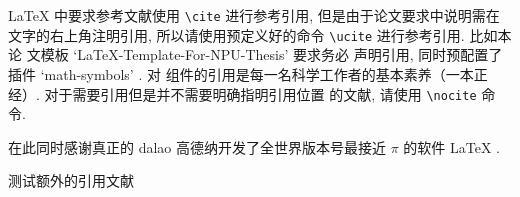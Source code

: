 \LaTeX{} 中要求参考文献使用 \lstinline`\cite` 进行参考引用, 但是由于论文要求中说明需在
文字的右上角注明引用, 所以请使用预定义好的命令 \lstinline`\ucite` 进行参考引用. 比如本论
文模板 `LaTeX-Template-For-NPU-Thesis'  要求务必
声明引用, 同时预配置了插件 `math-symbols' . 对
组件的引用是每一名科学工作者的基本素养（一本正经）. 对于需要引用但是并不需要明确指明引用位置
的文献, 请使用 \lstinline`\nocite` 命令.

在此同时感谢真正的 dalao 高德纳开发了全世界版本号最接近 $\pi$ 的软件 \LaTeX{}
\nocite{lamport1989latex:}.

测试额外的引用文献 

\endinput
